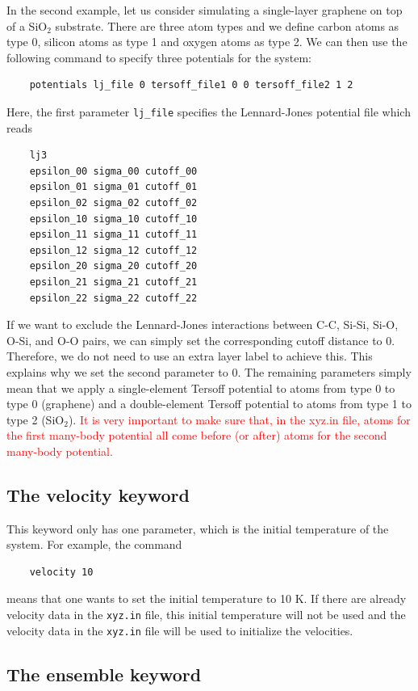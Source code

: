 \documentclass[12pt,a4paper]{report}
\begin{document}
In the second example, let us consider simulating a single-layer graphene on top of a SiO$_2$ substrate. There are three atom types and we define carbon atoms as type 0, silicon atoms as type 1 and oxygen atoms as type 2. We can then use the following command to specify three potentials for the system:
\begin{verbatim}
    potentials lj_file 0 tersoff_file1 0 0 tersoff_file2 1 2
\end{verbatim}
Here,  the first parameter \verb"lj_file" specifies the Lennard-Jones potential file which reads 
\begin{verbatim}
    lj3
    epsilon_00 sigma_00 cutoff_00
    epsilon_01 sigma_01 cutoff_01
    epsilon_02 sigma_02 cutoff_02
    epsilon_10 sigma_10 cutoff_10
    epsilon_11 sigma_11 cutoff_11
    epsilon_12 sigma_12 cutoff_12
    epsilon_20 sigma_20 cutoff_20
    epsilon_21 sigma_21 cutoff_21
    epsilon_22 sigma_22 cutoff_22
\end{verbatim}
If we want to exclude the Lennard-Jones interactions between C-C, Si-Si, Si-O, O-Si, and O-O pairs, we can simply set the corresponding cutoff distance to 0. Therefore, we do not need to use an extra layer label to achieve this. This explains why we set the second parameter to 0. The remaining parameters simply mean that we apply a single-element Tersoff potential to atoms from type 0 to type 0 (graphene) and a double-element Tersoff potential to atoms from type 1 to type 2 (SiO$_2$). \textcolor{red}{It is very important to make sure that, in the xyz.in file, atoms for the first many-body potential all come before (or after) atoms for the second many-body potential.}


\subsection{The velocity keyword}

This keyword only has one parameter, which is the initial temperature of the system. For example, the command
\begin{verbatim}
    velocity 10
\end{verbatim}
means that one wants to set the initial temperature to 10 K. If there are already velocity data in the \verb"xyz.in" file, this initial temperature will not be used and the velocity data in the \verb"xyz.in" file will be used to initialize the velocities.

\subsection{The ensemble keyword}
\end{document}
